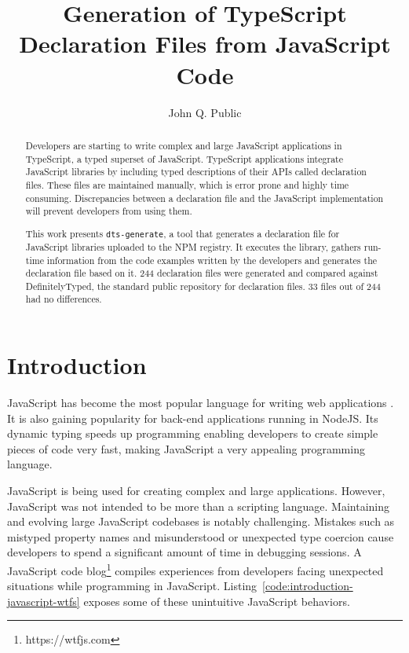 \documentclass[a4paper,english,cleveref, autoref]{lipics-v2019}
\title{Generation of TypeScript Declaration Files from JavaScript Code}
\author{John Q. Public}{Dummy University Computing Laboratory, Country \and My second affiliation, Country \and \url{http://www.myhomepage.edu} }{johnqpublic@dummyuni.org}{https://orcid.org/0000-0002-1825-0097}{(Optional) author-specific funding acknowledgements}%
\newcommand{\coderef}[1]{Listing~\ref{#1}}
\begin{document}
\maketitle

\begin{abstract}
Developers are starting to write complex and large JavaScript applications in TypeScript, a typed superset of JavaScript. TypeScript applications integrate JavaScript libraries by including typed descriptions of their APIs called declaration files. These files are maintained manually, which is error prone and highly time consuming. Discrepancies between a declaration file and the JavaScript implementation will prevent developers from using them.

This work presents \lstinline[language={}]!dts-generate!, a tool that generates a declaration file for JavaScript libraries uploaded to the NPM registry. It executes the library, gathers run-time information from the code examples written by the developers and generates the declaration file based on it. 244 declaration files were generated and compared against DefinitelyTyped, the standard public repository for declaration files. 33 files out of 244 had no differences.
\end{abstract}

\section{Introduction}
JavaScript has become the most popular language for writing web applications \cite{github-statistics}. It is also gaining popularity for back-end applications running in NodeJS. Its dynamic typing speeds up programming enabling developers to create simple pieces of code very fast, making JavaScript a very appealing programming language.

JavaScript is being used for creating complex and large applications. However, JavaScript was not intended to be more than a scripting language. Maintaining and evolving large JavaScript codebases is notably challenging. Mistakes such as mistyped property names and misunderstood or unexpected type coercion cause developers to spend a significant amount of time in debugging sessions. A JavaScript code blog\footnote{https://wtfjs.com} compiles experiences from developers facing unexpected situations while programming in JavaScript. \coderef{code:introduction-javascript-wtfs} exposes some of these unintuitive JavaScript behaviors.
\end{document}
